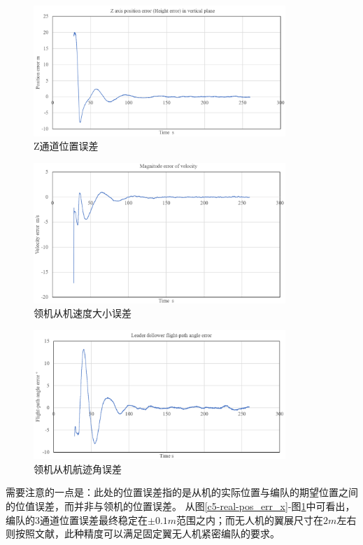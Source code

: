 \begin{figure}[H]
    \centering
    \includegraphics[width=0.85\textwidth]{figures/c5/update/pos_z}
    \caption{Z通道位置误差}\label{c5-real-pos_err_z}
\end{figure}
\begin{figure}[H]
    \centering
    \includegraphics[width=0.85\textwidth]{figures/c5/update/vel}
    \caption{领机从机速度大小误差}\label{c5-real-vel_err}
\end{figure}
\begin{figure}[H]
    \centering
    \includegraphics[width=0.85\textwidth]{figures/c5/update/angle}
    \caption{领机从机航迹角误差}\label{c5-real-eta_err}
\end{figure}
需要注意的一点是：此处的位置误差指的是从机的实际位置与编队的期望位置之间的位值误差，而并非与领机的位置误差。
从图\ref{c5-real-pos_err_x}-图\ref{c5-real-pos_err_z}中可看出，编队的3通道位置误差最终稳定在$\pm0.1m$范围之内；而无人机的翼展尺寸在$2m$左右
则按照文献\cite{Zhang2017Aerodynamics}，此种精度可以满足固定翼无人机紧密编队的要求。

